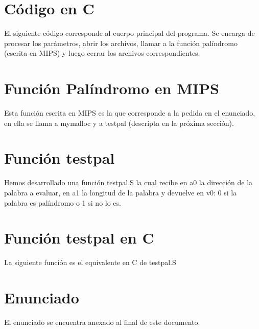 \documentclass[11pt,a4paper]{article}
\begin{document}
\section{Código en C}
El siguiente código corresponde al cuerpo principal del programa. Se encarga de procesar los parámetros, abrir los archivos, llamar a la función palíndromo (escrita en MIPS) y luego cerrar los archivos correspondientes.



\section{Función Palíndromo en MIPS}
Esta función escrita en MIPS es la que corresponde a la pedida en el enunciado, en ella se llama a mymalloc y a testpal (descripta en la próxima sección).



\section{Función testpal}
Hemos desarrollado una función testpal.S la cual recibe en a0 la dirección de la palabra a evaluar, en a1 la longitud de la palabra y devuelve en v0: 0 si la palabra es palíndromo o 1 si no lo es.



\section{Función testpal en C}
La siguiente función es el equivalente en C de testpal.S



\section{Enunciado}
El enunciado se encuentra anexado al final de este documento.
\end{document}
